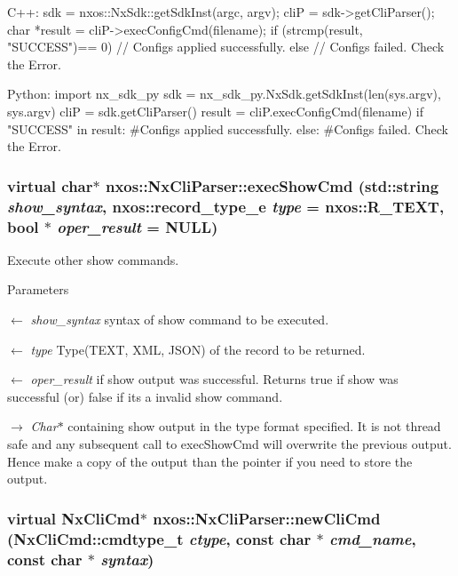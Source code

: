 \begin{DoxyCode}
  C++:
       sdk = nxos::NxSdk::getSdkInst(argc, argv);
       cliP = sdk->getCliParser();
       char *result = cliP->execConfigCmd(filename);
       if (strcmp(result, "SUCCESS")== 0) {
           // Configs applied successfully.
       } else {
           // Configs failed. Check the Error.
       }

  Python:
       import nx_sdk_py
       sdk = nx_sdk_py.NxSdk.getSdkInst(len(sys.argv), sys.argv)
       cliP = sdk.getCliParser()
       result = cliP.execConfigCmd(filename)
       if "SUCCESS" in result:
           #Configs applied successfully.
       else:
           #Configs failed. Check the Error.
\end{DoxyCode}
 \hypertarget{classnxos_1_1NxCliParser_a44b08502fa02c0f83b9dc26ef02e2be8}{
\subsubsection[{execShowCmd}]{\setlength{\rightskip}{0pt plus 5cm}virtual char$\ast$ nxos::NxCliParser::execShowCmd (std::string {\em show\_\-syntax}, \/  nxos::record\_\-type\_\-e {\em type} = {\ttfamily nxos::R\_\-TEXT}, \/  bool $\ast$ {\em oper\_\-result} = {\ttfamily NULL})}}
\label{classnxos_1_1NxCliParser_a44b08502fa02c0f83b9dc26ef02e2be8}
Execute other show commands. 
\begin{DoxyParams}{Parameters}
\item[\mbox{$\leftarrow$} {\em show\_\-syntax}]syntax of show command to be executed. \item[\mbox{$\leftarrow$} {\em type}]Type(TEXT, XML, JSON) of the record to be returned. \item[\mbox{$\leftarrow$} {\em oper\_\-result}]if show output was successful. Returns true if show was successful (or) false if its a invalid show command. \item[\mbox{$\rightarrow$} {\em Char$\ast$}]containing show output in the type format specified. It is not thread safe and any subsequent call to execShowCmd will overwrite the previous output. Hence make a copy of the output than the pointer if you need to store the output. \end{DoxyParams}
\hypertarget{classnxos_1_1NxCliParser_a210cbbb8b312093285741f753c4cdcda}{
\subsubsection[{newCliCmd}]{\setlength{\rightskip}{0pt plus 5cm}virtual {\bf NxCliCmd}$\ast$ nxos::NxCliParser::newCliCmd ({\bf NxCliCmd::cmdtype\_\-t} {\em ctype}, \/  const char $\ast$ {\em cmd\_\-name}, \/  const char $\ast$ {\em syntax})}}

